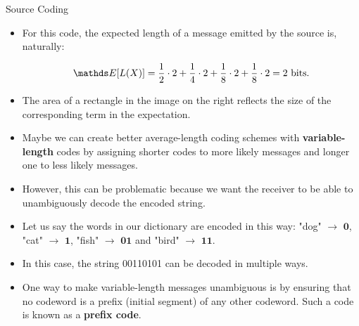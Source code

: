 \begin{vbframe} {Source Coding}
  \begin{figure}
    \centering
  \end{figure}
  
  \begin{itemize}
    \item For this code, the expected length of a message emitted by the source is, naturally:

      $$\E[L(X)] = \frac{1}{2} \cdot 2 + \frac{1}{4} \cdot 2 + \frac{1}{8} \cdot 2 + \frac{1}{8} \cdot 2 = 2 \text{ bits.}$$

    \item The area of a rectangle in the image on the right reflects the size of the corresponding term in the expectation.

  \end{itemize}
  
\framebreak

\begin{itemize}
  \item Maybe we can create better average-length coding schemes with \textbf{variable-length} codes by assigning shorter codes to more likely messages and longer one to less likely messages.
  \item However, this can be problematic because we want the receiver to be able to unambiguously decode the encoded string.
  \item Let us say the words in our dictionary are encoded in this way: "dog" $\rightarrow$ $\mathbf{0}$, "cat" $\rightarrow$ $\mathbf{1}$, "fish" $\rightarrow$ $\mathbf{01}$ and "bird" $\rightarrow$ $\mathbf{11}$.
  \item In this case, the string 00110101 can be decoded in multiple ways.
  \begin{figure}
    \centering
  \end{figure}
    \item One way to make variable-length messages unambiguous is by ensuring that no codeword is a prefix (initial segment) of any other codeword. Such a code is known as a \textbf{prefix code}.
\end{itemize}


\end{vbframe}
